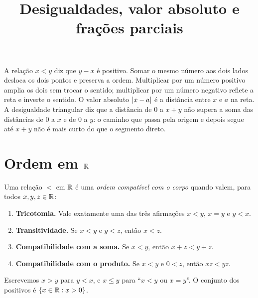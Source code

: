 \documentclass[11pt,a4paper]{article}
\title{Desigualdades, valor absoluto e frações parciais}
\author{}
\date{}
\begin{document}
\maketitle
\tableofcontents


\begin{intuicao}
A relação $x<y$ diz que $y-x$ é positivo. Somar o mesmo número aos dois lados desloca os dois pontos e preserva a ordem. Multiplicar por um número positivo amplia os dois sem trocar o sentido; multiplicar por um número negativo reflete a reta e inverte o sentido. O valor absoluto $\left\lvert x-a \right\rvert$ é a distância entre $x$ e $a$ na reta. A desigualdade triangular diz que a distância de $0$ a $x+y$ não supera a soma das distâncias de $0$ a $x$ e de $0$ a $y$: o caminho que passa pela origem e depois segue até $x+y$ não é mais curto do que o segmento direto.
\end{intuicao}

\section{Ordem em \texorpdfstring{$\mathbb{R}$}{R}}

\begin{definicao}
Uma relação $<$ em $\mathbb{R}$ é uma \emph{ordem compatível com o corpo} quando valem, para todos $x,y,z\in\mathbb{R}$:
\begin{enumerate}
\item \textbf{Tricotomia.} Vale exatamente uma das três afirmações $x<y$, $x=y$ e $y<x$.
\item \textbf{Transitividade.} Se $x<y$ e $y<z$, então $x<z$.
\item \textbf{Compatibilidade com a soma.} Se $x<y$, então $x+z<y+z$.
\item \textbf{Compatibilidade com o produto.} Se $x<y$ e $0<z$, então $xz<yz$.
\end{enumerate}
Escrevemos $x>y$ para $y<x$, e $x\le y$ para ``$x<y$ ou $x=y$''. O conjunto dos positivos é $\{x\in\mathbb{R}:x>0\}$.
\end{definicao}
\end{document}
